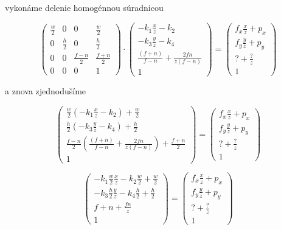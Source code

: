 vykonáme delenie homogénnou súradnicou

$$
\begin{pmatrix}
\frac{w}{2} & 0 & 0 & \frac{w}{2} \\
0 & \frac{h}{2} & 0 & \frac{h}{2} \\
0 & 0 & \frac{f-n}{2} & \frac{f+n}{2} \\
0 & 0 & 0 & 1
\end{pmatrix}
\cdot
\begin{pmatrix}
- k_1 \frac{x}{z} - k_2 \\
- k_3 \frac{y}{z} - k_4 \\
\frac{(f+n)}{f-n} + \frac{2fn}{z(f-n)} \\
1
\end{pmatrix}
=
\begin{pmatrix}
f_x \frac{x}{z} + p_x \\
f_y \frac{y}{z} + p_y \\
? + \frac{?}{z} \\
1
\end{pmatrix}
$$

a znova zjednodušíme

$$
\begin{pmatrix}
\frac{w}{2} (- k_1 \frac{x}{z} - k_2) + \frac{w}{2} \\
\frac{h}{2} (- k_3 \frac{y}{z} - k_4) + \frac{h}{2} \\
\frac{f-n}{2} (\frac{(f+n)}{f-n} + \frac{2fn}{z(f-n)}) + \frac{f+n}{2} \\
1
\end{pmatrix}
=
\begin{pmatrix}
f_x \frac{x}{z} + p_x \\
f_y \frac{y}{z} + p_y \\
? + \frac{?}{z} \\
1
\end{pmatrix}
$$

$$
\begin{pmatrix}
- k_1 \frac{w}{2} \frac{x}{z} - k_2 \frac{w}{2} + \frac{w}{2} \\
- k_3 \frac{h}{2} \frac{y}{z} - k_4 \frac{h}{2} + \frac{h}{2} \\
f + n + \frac{fn}{z} \\
1
\end{pmatrix}
=
\begin{pmatrix}
f_x \frac{x}{z} + p_x \\
f_y \frac{y}{z} + p_y \\
? + \frac{?}{z} \\
1
\end{pmatrix}
$$

